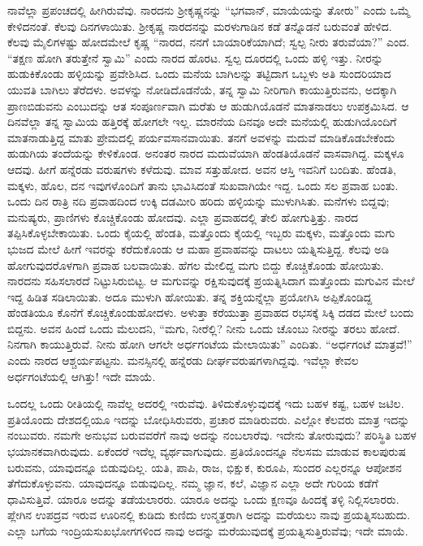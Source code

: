 ನಾವೆಲ್ಲಾ ಪ್ರಪಂಚದಲ್ಲಿ ಹೀಗಿರುವೆವು. ನಾರದನು ಶ‍್ರೀಕೃಷ್ಣನನ್ನು “ಭಗವಾನ್​, ಮಾಯೆಯನ್ನು ತೋರು” ಎಂದು ಒಮ್ಮೆ ಕೇಳಿದನಂತೆ. ಕೆಲವು ದಿನಗಳಾಯಿತು. ಶ‍್ರೀಕೃಷ್ಣ ನಾರದನನ್ನು ಮರಳುಗಾಡಿನ ಕಡೆ ತನ್ನೊಡನೆ ಬರುವಂತೆ ಹೇಳಿದ. ಕೆಲವು ಮೈಲಿಗಳಷ್ಟು ಹೋದಮೇಲೆ ಕೃಷ್ಣ “ನಾರದ, ನನಗೆ ಬಾಯಾರಿಕೆಯಾಗಿದೆ; ಸ್ವಲ್ಪ ನೀರು ತರುವೆಯಾ?” ಎಂದ. “ತಕ್ಷಣ ಹೋಗಿ ತರುತ್ತೇನೆ ಸ್ವಾಮಿ” ಎಂದು ನಾರದ ಹೊರಟ. ಸ್ವಲ್ಪ ದೂರದಲ್ಲಿ ಒಂದು ಹಳ್ಳಿ ಇತ್ತು. ನೀರನ್ನು ಹುಡುಕಿಕೊಂಡು ಹಳ್ಳಿಯನ್ನು ಪ್ರವೇಶಿಸಿದ. ಒಂದು ಮನೆಯ ಬಾಗಿಲನ್ನು ತಟ್ಟಿದಾಗ ಒಬ್ಬಳು ಅತಿ ಸುಂದರಿಯಾದ ಯುವತಿ ಬಾಗಿಲು ತೆರೆದಳು. ಅವಳನ್ನು ನೋಡಿದೊಡನೆಯೆ, ತನ್ನ ಸ್ವಾಮಿ ನೀರಿಗಾಗಿ ಕಾಯುತ್ತಿರುವನು, ಅದಕ್ಕಾಗಿ ಪ್ರಾಣಬಿಡುವನು ಎಂಬುದನ್ನು ಆತ ಸಂಪೂರ್ಣವಾಗಿ ಮರೆತು ಆ ಹುಡುಗಿಯೊಡನೆ ಮಾತನಾಡಲು ಉಪಕ್ರಮಿಸಿದ. ಆ ದಿನವೆಲ್ಲಾ ತನ್ನ ಸ್ವಾಮಿಯ ಹತ್ತಿರಕ್ಕೆ ಹೋಗಲೇ ಇಲ್ಲ. ಮಾರನೆಯ ದಿನವೂ ಅದೇ ಮನೆಯಲ್ಲಿ ಹುಡುಗಿಯೊಂದಿಗೆ ಮಾತನಾಡುತ್ತಿದ್ದ ಮಾತು ಪ್ರೇಮದಲ್ಲಿ ಪರ್ಯವಸಾನವಾಯಿತು. ತನಗೆ ಅವಳನ್ನು ಮದುವೆ ಮಾಡಿಕೊಡಬೇಕೆಂದು ಹುಡುಗಿಯ ತಂದೆಯನ್ನು ಕೇಳಿಕೊಂಡ. ಅನಂತರ ನಾರದ ಮದುವೆಯಾಗಿ ಹೆಂಡತಿಯೊಡನೆ ವಾಸವಾಗಿದ್ದ. ಮಕ್ಕಳೂ ಆದವು. ಹೀಗೆ ಹನ್ನೆರಡು ವರುಷಗಳು ಕಳೆದುವು. ಮಾವ ಸತ್ತುಹೋದ. ಅವನ ಆಸ್ತಿ ಇವನಿಗೆ ಬಂದಿತು. ಹೆಂಡತಿ, ಮಕ್ಕಳು, ಹೊಲ, ದನ ಇವುಗಳೊಂದಿಗೆ ತಾನು ಭಾವಿಸಿದಂತೆ ಸುಖವಾಗಿಯೇ ಇದ್ದ. ಒಂದು ಸಲ ಪ್ರವಾಹ ಬಂತು. ಒಂದು ದಿನ ರಾತ್ರಿ ನದಿ ಪ್ರವಾಹದಿಂದ ಉಕ್ಕಿ ದಡಮೀರಿ ಹರಿದು ಹಳ್ಳಿಯನ್ನು ಮುಳುಗಿಸಿತು. ಮನೆಗಳು ಬಿದ್ದವು; ಮನುಷ್ಯರು, ಪ್ರಾಣಿಗಳು ಕೊಚ್ಚಿಕೊಂಡು ಹೋದವು. ಎಲ್ಲಾ ಪ್ರವಾಹದಲ್ಲಿ ತೇಲಿ ಹೋಗುತ್ತಿತ್ತು. ನಾರದ ತಪ್ಪಿಸಿಕೊಳ್ಳಬೇಕಾಯಿತು. ಒಂದು ಕೈಯಲ್ಲಿ ಹೆಂಡತಿ, ಮತ್ತೊಂದು ಕೈಯಲ್ಲಿ ಇಬ್ಬರು ಮಕ್ಕಳು, ಮತ್ತೊಂದು ಮಗು ಭುಜದ ಮೇಲೆ ಹೀಗೆ ಇವರನ್ನು ಕರೆದುಕೊಂಡು ಆ ಮಹಾ ಪ್ರವಾಹವನ್ನು ದಾಟಲು ಯತ್ನಿಸುತ್ತಿದ್ದ. ಕೆಲವು ಅಡಿ ಹೋಗುವುದರೊಳಗಾಗಿ ಪ್ರವಾಹ ಬಲವಾಯಿತು. ಹೆಗಲ ಮೇಲಿದ್ದ ಮಗು ಬಿದ್ದು ಕೊಚ್ಚಿಕೊಂಡು ಹೋಯಿತು. ನಾರದನು ಸಹಿಸಲಾರದೆ ನಿಟ್ಟುಸಿರುಬಿಟ್ಟ. ಆ ಮಗುವನ್ನು ರಕ್ಷಿಸುವುದಕ್ಕೆ ಪ್ರಯತ್ನಿಸಿದಾಗ ಮತ್ತೊಂದು ಮಗುವಿನ ಮೇಲೆ ಇದ್ದ ಹಿಡಿತ ಸಡಿಲಾಯಿತು. ಅದೂ ಮುಳುಗಿ ಹೋಯಿತು. ತನ್ನ ಶಕ್ತಿಯನ್ನೆಲ್ಲಾ ಪ್ರಯೋಗಿಸಿ ಅಪ್ಪಿಕೊಂಡಿದ್ದ ಹೆಂಡತಿಯೂ ಕೊನೆಗೆ ಕೊಚ್ಚಿಕೊಂಡುಹೋದಳು. ಅಳುತ್ತಾ ಕರೆಯುತ್ತಾ ಪ್ರವಾಹದ ರಭಸಕ್ಕೆ ಸಿಕ್ಕಿ ದಡದ ಮೇಲೆ ಬಂದು ಬಿದ್ದನು. ಅವನ ಹಿಂದೆ ಒಂದು ಮೆಲುದನಿ, “ಮಗು, ನೀರೆಲ್ಲಿ? ನೀನು ಒಂದು ಚೊಂಬು ನೀರನ್ನು ತರಲು ಹೋದೆ. ನಿನಗಾಗಿ ಕಾಯುತ್ತಿರುವೆ. ನೀನು ಹೋಗಿ ಆಗಲೇ ಅರ್ಧಗಂಟೆಯ ಮೇಲಾಯಿತು” ಎಂದಿತು. “ಅರ್ಧಗಂಟೆ ಮಾತ್ರವೆ!” ಎಂದು ನಾರದ ಆಶ್ಚರ್ಯಪಟ್ಟನು. ಮನಸ್ಸಿನಲ್ಲಿ ಹನ್ನೆರಡು ದೀರ್ಘವರುಷಗಳಾಗಿದ್ದವು. ಇವೆಲ್ಲಾ ಕೇವಲ ಅರ್ಧಗಂಟೆಯಲ್ಲಿ ಆಗಿತ್ತು! ಇದೇ ಮಾಯೆ.

\vskip 0.3cm

ಒಂದಲ್ಲ ಒಂದು ರೀತಿಯಲ್ಲಿ ನಾವೆಲ್ಲ ಅದರಲ್ಲಿ ಇರುವೆವು. ತಿಳಿದುಕೊಳ್ಳುವುದಕ್ಕೆ ಇದು ಬಹಳ ಕಷ್ಟ, ಬಹಳ ಜಟಿಲ. ಪ್ರತಿಯೊಂದು ದೇಶದಲ್ಲಿಯೂ ಇದನ್ನು ಬೋಧಿಸಿರುವರು, ಪ್ರಚಾರ ಮಾಡಿರುವರು. ಎಲ್ಲೋ ಕೆಲವರು ಮಾತ್ರ ಇದನ್ನು ನಂಬುವರು. ನಮಗೇ ಅನುಭವ ಬರುವವರೆಗೆ ನಾವು ಅದನ್ನು ನಂಬಲಾರೆವು. ಇದೇನು ತೋರುವುದು? ಪರಿಸ್ಥಿತಿ ಬಹಳ ಭಯಾನಕವಾಗಿರುವುದು. ಏಕೆಂದರೆ ಇದೆಲ್ಲ ವ್ಯರ್ಥವಾಗುವುದು. ಪ್ರತಿಯೊಂದನ್ನೂ ನೆಲಸಮ ಮಾಡುವ ಕಾಲಪುರುಷ ಬರುವನು, ಯಾವುದನ್ನೂ ಬಿಡುವುದಿಲ್ಲ. ಯತಿ, ಪಾಪಿ, ರಾಜ, ಭಿಕ್ಷುಕ, ಕುರೂಪಿ, ಸುಂದರ ಎಲ್ಲರನ್ನೂ ಆಪೋಶನ ತೆಗೆದುಕೊಳ್ಳುವನು. ಯಾವುದನ್ನೂ ಬಿಡುವುದಿಲ್ಲ. ನಮ್ಮ ಜ್ಞಾನ, ಕಲೆ, ವಿಜ್ಞಾನ ಎಲ್ಲಾ ಅದೇ ಗುರಿಯ ಕಡೆಗೆ ಧಾವಿಸುತ್ತಿವೆ. ಯಾರೂ ಅದನ್ನು ತಡೆಯಲಾರರು. ಯಾರೂ ಅದನ್ನು ಒಂದು ಕ್ಷಣವೂ ಹಿಂದಕ್ಕೆ ತಳ್ಳಿ ನಿಲ್ಲಿಸಲಾರರು. ಪ್ಲೇಗಿನ ಉಪದ್ರವ ಇರುವ ಊರಿನಲ್ಲಿ ಕುಡಿದು ಕುಣಿದು ಉನ್ಮತ್ತರಾಗಿ ಅದನ್ನು ಮರೆಯಲು ನಾವು ಪ್ರಯತ್ನಿಸಬಹುದು. ಎಲ್ಲಾ ಬಗೆಯ ಇಂದ್ರಿಯಸುಖಭೋಗಗಳಿಂದ ನಾವು ಅದನ್ನು ಮರೆಯುವುದಕ್ಕೆ ಪ್ರಯತ್ನಿಸುತ್ತಿರುವೆವು; ಇದೇ ಮಾಯೆ.

